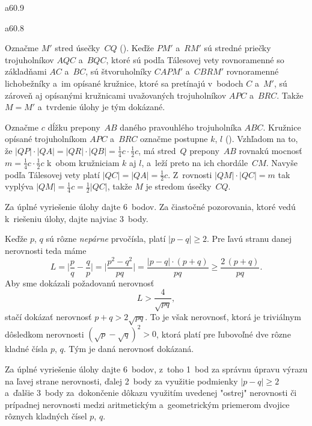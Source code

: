 {%
\epsplace a60.9 \hfil\Obr\par
\epsplace a60.8 \hfil\Obr\par
Označme $M'$ stred úsečky~$CQ$ (\obr).
Keďže $PM'$ a~$RM'$ sú stredné priečky trojuholníkov $AQC$ a~$BQC$, ktoré sú podľa Tálesovej vety
rovnoramenné so základňami $AC$ a~$BC$, sú štvoruholníky
$CAPM'$ a~$CBRM'$ rovnoramenné lichobežníky a~im
opísané kružnice, ktoré sa pretínajú v~bodoch $C$ a~$M'$, sú zároveň aj opísanými
kružnicami uvažovaných trojuholníkov $APC$ a~$BRC$. Takže $M=M'$ a~tvrdenie úlohy je tým dokázané.
\inspicture

\ineriesenie
Označme $c$ dĺžku prepony~$AB$ daného pravouhlého trojuholníka $ABC$.
Kružnice opísané trojuholníkom $APC$ a~$BRC$ označme postupne $k$,
$l$ (\obr). Vzhľadom na to, že ${|QP|\cdot|QA|}={|QR|\cdot|QB|}=\frac14c\cdot
\frac12c$, má stred~$Q$ prepony~$AB$ rovnakú mocnosť $m=\frac14c\cdot
\frac12c$ k~obom kružniciam $k$ aj $l$,
a~leží preto na ich chordále~$CM$. Navyše podľa Tálesovej vety
platí $|QC|=|QA|=\frac12c$. Z~rovnosti $|QM|\cdot|QC|=m$ tak vyplýva
$|QM|=\frac14c=\frac12|QC|$, takže $M$ je stredom úsečky~$CQ$.
\inspicture


\nobreak\medskip\petit\noindent
Za úplné vyriešenie úlohy dajte 6~bodov. Za čiastočné pozorovania, ktoré
vedú k~riešeniu úlohy, dajte najviac 3~body.
\endpetit
\bigbreak
}

{%
Keďže $p$, $q$ sú rôzne {\it nepárne\/} prvočísla, platí $|p-q|\ge2$.
Pre ľavú stranu danej nerovnosti teda máme
$$
L=\bigg|\frac{p}{q}-\frac{q}{p}\bigg|=\bigg|\frac{p^2-q^2}{pq}\bigg|
     =\frac{|p-q|\cdot(p+q)}{pq}\ge
    \frac{2\,(p+q)}{pq}.
$$
Aby sme dokázali požadovanú nerovnosť
$$
L>\dfrac{4}{\sqrt{pq}},
$$
stačí dokázať nerovnosť $p+q>2\sqrt{pq}$. To je však nerovnosť, ktorá
je triviálnym dôsledkom nerovnosti $(\sqrt p-\sqrt q)^2>0$, ktorá platí pre
ľubovoľné dve rôzne kladné čísla $p$, $q$.
Tým je daná nerovnosť dokázaná.

\nobreak\medskip\petit\noindent
Za úplné vyriešenie úlohy dajte 6~bodov, z~toho 1~bod za správnu úpravu výrazu na ľavej strane nerovnosti, ďalej 2~body za využitie
podmienky $|p-q|\ge 2$ a~ďalšie 3~body za~dokončenie dôkazu využitím uvedenej "ostrej"
nerovnosti či prípadnej nerovnosti medzi aritmetickým a~geometrickým priemerom dvojice
rôznych kladných čísel $p$, $q$.
\endpetit
}

